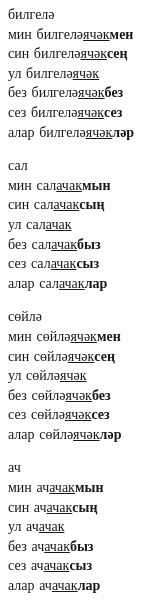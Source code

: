 \begin{multicols}{4}
\begin{enumerate}
\begin{minipage}{\linewidth}
    \item
    билгелә\\
    мин билгелә\underline{ячәк}\textbf{мен}\\
    син билгелә\underline{ячәк}\textbf{сең}\\
    ул билгелә\underline{ячәк}\\
    без билгелә\underline{ячәк}\textbf{без}\\
    сез билгелә\underline{ячәк}\textbf{сез}\\
    алар билгелә\underline{ячәк}\textbf{ләр}\\
\end{minipage}

\begin{minipage}{\linewidth}
    \item
    сал\\
    мин сал\underline{ачак}\textbf{мын}\\
    син сал\underline{ачак}\textbf{сың}\\
    ул сал\underline{ачак}\\
    без сал\underline{ачак}\textbf{быз}\\
    сез сал\underline{ачак}\textbf{сыз}\\
    алар сал\underline{ачак}\textbf{лар}\\
\end{minipage}

\begin{minipage}{\linewidth}
    \item
    сөйлә\\
    мин сөйлә\underline{ячәк}\textbf{мен}\\
    син сөйлә\underline{ячәк}\textbf{сең}\\
    ул сөйлә\underline{ячәк}\\
    без сөйлә\underline{ячәк}\textbf{без}\\
    сез сөйлә\underline{ячәк}\textbf{сез}\\
    алар сөйлә\underline{ячәк}\textbf{ләр}\\
\end{minipage}

\begin{minipage}{\linewidth}
    \item
    ач\\
    мин ач\underline{ачак}\textbf{мын}\\
    син ач\underline{ачак}\textbf{сың}\\
    ул ач\underline{ачак}\\
    без ач\underline{ачак}\textbf{быз}\\
    сез ач\underline{ачак}\textbf{сыз}\\
    алар ач\underline{ачак}\textbf{лар}\\
\end{minipage}


\end{enumerate}
\end{multicols}
